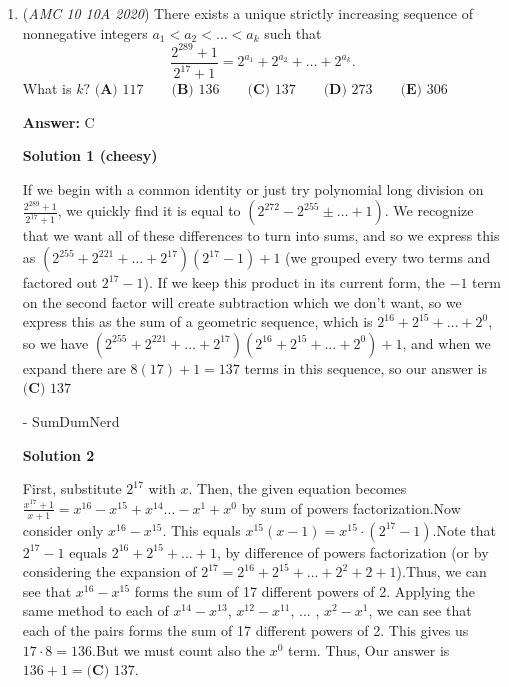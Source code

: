 \begin{enumerate}
 set  
 \[\angle ACB = \theta , C= \cos(\theta), S = \sin(\theta)\]

 \[\dfrac{E_y}{E_x} = \dfrac{30C}  { 20C+30S}  =  \dfrac{15S} {20C-15C}\]

 \[2SC = \dfrac35\]

 \begin{align*} [ABCD] &= [ABD]+[CBD] \\ &= \dfrac12\cdot 20C\cdot 30C  + \dfrac12 \cdot 20S (20C+30S) \\ &= 100\cdot   2SC + 300 \\ &= \boxed{\text{(D) } 360}. \end{align*}




	\item (\textit{AMC 10 10A 2020}) There exists a unique strictly increasing sequence of nonnegative integers $a_1 < a_2 < \ldots < a_k$ such that
 \[\frac{2^{289}+1}{2^{17}+1} = 2^{a_1} + 2^{a_2} + \ldots + 2^{a_k}.\]What is $k?$
$\textbf{(A) } 117 \qquad \textbf{(B) } 136 \qquad \textbf{(C) } 137 \qquad \textbf{(D) } 273 \qquad \textbf{(E) } 306$

 \textbf{Answer: }C



\textbf{Solution 1 (cheesy)}

If we begin with a common identity or just try polynomial long division on $\frac{2^{289}+1}{2^{17}+1}$, we quickly find it is equal to $\left( 2^{272}-2^{255} \pm \dots + 1 \right)$. We recognize that we want all of these differences to turn into sums, and so we express this as $\left( 2^{255}+2^{221}+ \dots +2^{17} \right) \left( 2^{17}-1 \right) + 1$ (we grouped every two terms and factored out $2^{17}-1$). If we keep this product in its current form, the $-1$ term on the second factor will create subtraction which we don't want, so we express this as the sum of a geometric sequence, which is $2^{16}+2^{15} + \dots + 2^0$, so we have $\left( 2^{255}+2^{221}+ \dots +2^{17} \right) \left( 2^{16} + 2^{15} + \dots + 2^0 \right) + 1$, and when we expand there are $8(17)+1=137$ terms in this sequence, so our answer is $\boxed{\textbf{(C) } 137}$

 - SumDumNerd

 



\textbf{Solution 2}

First, substitute $2^{17}$ with $x$. Then, the given equation becomes $\frac{x^{17}+1}{x+1}=x^{16}-x^{15}+x^{14}...-x^1+x^0$ by sum of powers factorization.Now consider only $x^{16}-x^{15}$. This equals $x^{15}(x-1)=x^{15} \cdot (2^{17}-1)$.Note that $2^{17}-1$ equals $2^{16}+2^{15}+...+1$, by difference of powers factorization (or by considering the expansion of $2^{17}=2^{16}+2^{15}+...+2^{2}+2 + 1$).Thus, we can see that $x^{16}-x^{15}$ forms the sum of 17 different powers of 2. Applying the same method to each of $x^{14}-x^{13}$, $x^{12}-x^{11}$, ... , $x^{2}-x^{1}$, we can see that each of the pairs forms the sum of 17 different powers of 2. This gives us $17 \cdot 8=136$.But we must count also the $x^0$ term. Thus, Our answer is $136+1=\boxed{\textbf{(C) } 137}$.


\end{enumerate}
